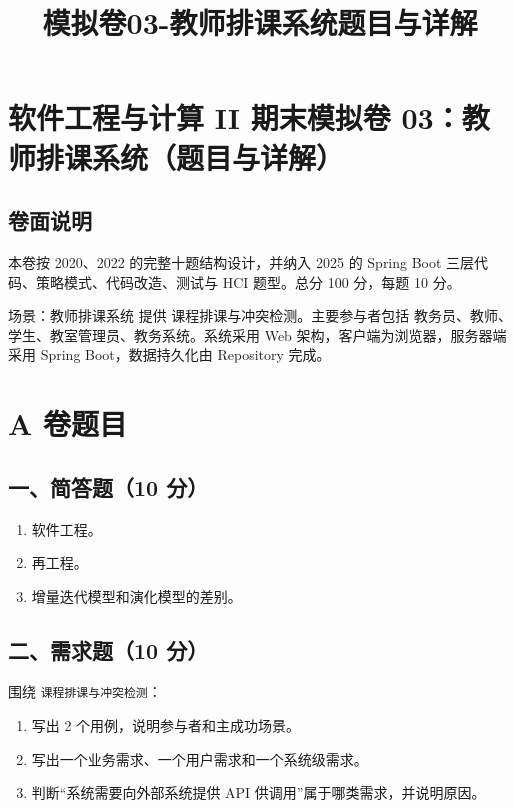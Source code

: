 \documentclass[UTF8,zihao=-4]{ctexart}
\title{模拟卷03-教师排课系统题目与详解}
\author{}
\date{}
\begin{document}
\maketitle
\setcounter{tocdepth}{1}
\tableofcontents
\newpage
\section{软件工程与计算 II 期末模拟卷 03：教师排课系统（题目与详解）}


\subsection{卷面说明}


本卷按 2020、2022 的完整十题结构设计，并纳入 2025 的 Spring Boot 三层代码、策略模式、代码改造、测试与 HCI 题型。总分 100 分，每题 10 分。


场景：教师排课系统 提供 课程排课与冲突检测。主要参与者包括 教务员、教师、学生、教室管理员、教务系统。系统采用 Web 架构，客户端为浏览器，服务器端采用 Spring Boot，数据持久化由 Repository 完成。


\section{A 卷题目}


\subsection{一、简答题（10 分）}


\begin{enumerate}
\item 软件工程。
\item 再工程。
\item 增量迭代模型和演化模型的差别。
\end{enumerate}


\subsection{二、需求题（10 分）}


围绕 \texttt{课程排课与冲突检测}：


\begin{enumerate}
\item 写出 2 个用例，说明参与者和主成功场景。
\item 写出一个业务需求、一个用户需求和一个系统级需求。
\item 判断“系统需要向外部系统提供 API 供调用”属于哪类需求，并说明原因。
\end{enumerate}
\end{document}
